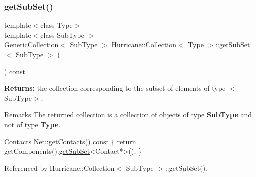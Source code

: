 \subsubsection{\texorpdfstring{get\+Sub\+Set()}{getSubSet()}\hspace{0.1cm}{\footnotesize\ttfamily [2/3]}}
{\footnotesize\ttfamily template$<$class Type$>$ \\
template$<$class Sub\+Type $>$ \\
\mbox{\hyperlink{classHurricane_1_1GenericCollection}{Generic\+Collection}}$<$ Sub\+Type $>$ \mbox{\hyperlink{classHurricane_1_1Collection}{Hurricane\+::\+Collection}}$<$ Type $>$\+::get\+Sub\+Set$<$ Sub\+Type $>$ (\begin{DoxyParamCaption}{ }\end{DoxyParamCaption}) const\hspace{0.3cm}{\ttfamily [inline]}}

{\bfseries Returns\+:} the collection corresponding to the subset of elements of type {\ttfamily $<$Sub\+Type$>$}.

\begin{DoxyRemark}{Remarks}
The returned collection is a collection of objects of type {\bfseries Sub\+Type} and not of type {\bfseries Type}.
\end{DoxyRemark}

\begin{DoxyCode}
\mbox{\hyperlink{namespaceHurricane_a1e6a8ab09f688509bd727b3fee02d0d2}{Contacts}} \mbox{\hyperlink{classHurricane_1_1Net_a9c397596fe9ecbf674712c72e0b9010c}{Net::getContacts}}()\textcolor{keyword}{ const}
\textcolor{keyword}{}\{
   \textcolor{keywordflow}{return} getComponents().\mbox{\hyperlink{classHurricane_1_1Collection_aa32ea7249d57ee05e3c71dcde8106832}{getSubSet}}<Contact*>();
\}
\end{DoxyCode}
 

Referenced by Hurricane\+::\+Collection$<$ Sub\+Type $>$\+::get\+Sub\+Set().

\mbox{\label{classHurricane_1_1Collection_a673afd14782da82ad03a68366ae1f09b}} 
